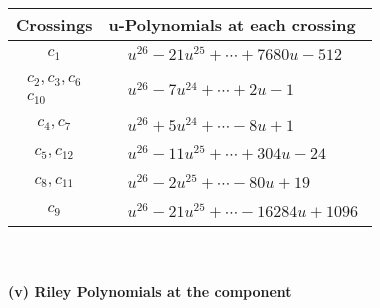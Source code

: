 \documentclass[1p]{elsarticle_modified}
\theoremstyle{definition}
\begin{document}
\begin{tabular}{m{50pt}|m{274pt}}
Crossings & \hspace{64pt}u-Polynomials at each crossing \\
\hline $$\begin{aligned}c_{1}\end{aligned}$$&$\begin{aligned}
&u^{26}-21 u^{25}+\cdots+7680 u-512
\end{aligned}$\\
\hline $$\begin{aligned}c_{2},c_{3},c_{6}\\c_{10}\end{aligned}$$&$\begin{aligned}
&u^{26}-7 u^{24}+\cdots+2 u-1
\end{aligned}$\\
\hline $$\begin{aligned}c_{4},c_{7}\end{aligned}$$&$\begin{aligned}
&u^{26}+5 u^{24}+\cdots-8 u+1
\end{aligned}$\\
\hline $$\begin{aligned}c_{5},c_{12}\end{aligned}$$&$\begin{aligned}
&u^{26}-11 u^{25}+\cdots+304 u-24
\end{aligned}$\\
\hline $$\begin{aligned}c_{8},c_{11}\end{aligned}$$&$\begin{aligned}
&u^{26}-2 u^{25}+\cdots-80 u+19
\end{aligned}$\\
\hline $$\begin{aligned}c_{9}\end{aligned}$$&$\begin{aligned}
&u^{26}-21 u^{25}+\cdots-16284 u+1096
\end{aligned}$\\
\hline
\end{tabular}\\~\\
\newpage\renewcommand{\arraystretch}{1}
\flushleft \textbf{(v) Riley Polynomials at the component}\newline \\
\end{document}
